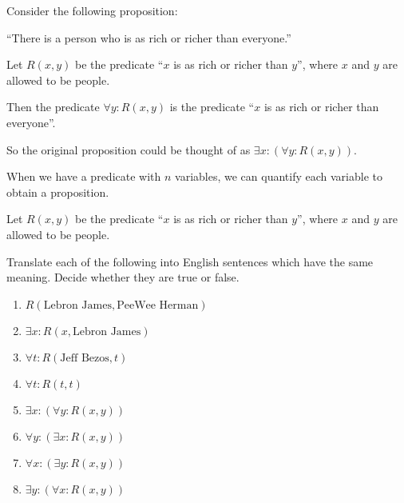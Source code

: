 Consider the following proposition:

\begin{centering}
		``There is a person who is as rich or richer than everyone.''
\end{centering}

Let $R(x,y)$ be the predicate ``$x$ is as rich or  richer than $y$'', where $x$ and $y$ are allowed to be people.

Then the predicate $\forall y: R(x,y)$ is the predicate ``$x$ is as rich or richer than everyone''.

So the original proposition could be thought of as $\exists x: \left( \forall y: R(x,y) \right)$.

When we have a predicate with $n$ variables, we can quantify each variable to obtain a proposition.

\begin{xca}
Let $R(x,y)$ be the predicate ``$x$ is as rich or  richer than $y$'', where $x$ and $y$ are allowed to be people.

Translate each of the following into English sentences which have the same meaning.  Decide whether they are true or false.

\begin{enumerate}
		\item $R(\textrm{Lebron James}, \textrm{PeeWee Herman})$
		\item $\exists x: R(x,\textrm{Lebron James})$
		\item $\forall t: R(\textrm{Jeff Bezos}, t )$
		\item $\forall t: R(t,t)$
		\item $\exists x: \left( \forall y : R(x,y)\right)$
		\item $\forall y : \left( \exists x : R(x,y)\right)$
		\item $\forall x : \left( \exists y : R(x,y)\right)$
		\item $\exists y : \left( \forall  x : R(x,y)\right)$
	\end{enumerate}
	\end{xca}

